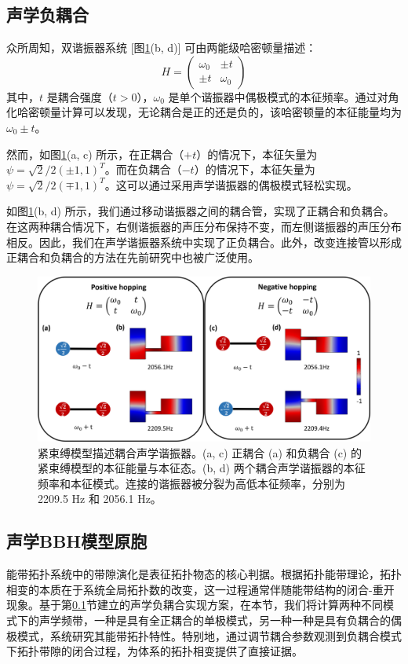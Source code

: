 \subsection{声学负耦合}
\label{sec:NegCoup}
众所周知，双谐振器系统 [图\ref{fig:NegCoup}(b, d)] 可由两能级哈密顿量描述：
\begin{equation}
    H = \begin{pmatrix} \omega_0 & \pm t \\ \pm t & \omega_0 \end{pmatrix}
\end{equation}
其中，\( t \) 是耦合强度（\( t > 0 \)），\( \omega_0 \) 是单个谐振器中偶极模式的本征频率。通过对角化哈密顿量计算可以发现，无论耦合是正的还是负的，该哈密顿量的本征能量均为 \( \omega_0 \pm t \)。

然而，如图\ref{fig:NegCoup}(a, c) 所示，在正耦合（\( +t \)）的情况下，本征矢量为$\psi=\sqrt{2}/2(\pm1,1)^T$。而在负耦合（\( -t \)）的情况下，本征矢量为$\psi=\sqrt{2}/2(\mp1,1)^T$。这可以通过采用声学谐振器的偶极模式轻松实现。

如图\ref{fig:NegCoup}(b, d) 所示，我们通过移动谐振器之间的耦合管，实现了正耦合和负耦合。在这两种耦合情况下，右侧谐振器的声压分布保持不变，而左侧谐振器的声压分布相反。因此，我们在声学谐振器系统中实现了正负耦合。此外，改变连接管以形成正耦合和负耦合的方法在先前研究中也被广泛使用\cite{xue2022projectively,li2022acoustic}。

\begin{figure}[htbp]
    \centering
    \includegraphics[width=0.75\linewidth]{figure/HOTIExp/NegCoup.png}
    \caption{紧束缚模型描述耦合声学谐振器。(a, c) 正耦合 (a) 和负耦合 (c) 的紧束缚模型的本征能量与本征态。(b, d) 两个耦合声学谐振器的本征频率和本征模式。连接的谐振器被分裂为高低本征频率，分别为 2209.5 Hz 和 2056.1 Hz。}
    \label{fig:NegCoup}
\end{figure}
\subsection{声学BBH模型原胞}
能带拓扑系统中的带隙演化是表征拓扑物态的核心判据。根据拓扑能带理论\cite{hasan2010colloquium}，拓扑相变的本质在于系统全局拓扑数的改变，这一过程通常伴随能带结构的闭合-重开现象。基于第\ref{sec:NegCoup}节建立的声学负耦合实现方案，在本节，我们将计算两种不同模式下的声学频带，一种是具有全正耦合的单极模式，另一种一种是具有负耦合的偶极模式，系统研究其能带拓扑特性。特别地，通过调节耦合参数观测到负耦合模式下拓扑带隙的闭合过程，为体系的拓扑相变提供了直接证据。

